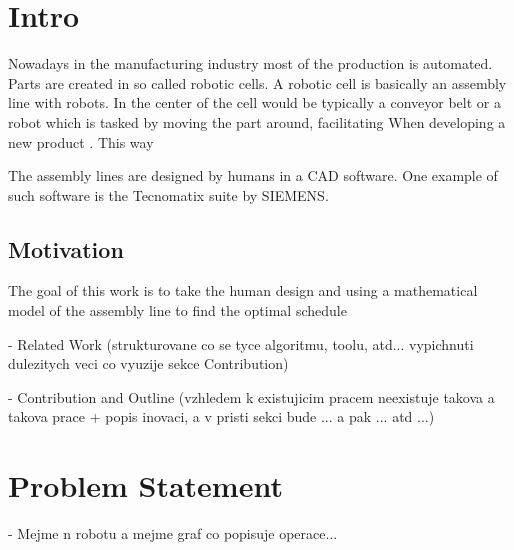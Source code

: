 \section{Intro}
Nowadays in the manufacturing industry most of the production is automated. Parts are created in so called robotic cells. A robotic cell is basically an assembly line with robots. In the center of the cell would be typically a conveyor belt or a robot which is tasked by moving the part around, facilitating   When developing a new product . This way 

The assembly lines are designed by humans in a CAD software. One example of such software is the Tecnomatix suite by SIEMENS.

\subsection{Motivation}
The goal of this work is to take the human design and using a mathematical model of the assembly line to find the optimal schedule


- Related Work (strukturovane co se tyce algoritmu, toolu, atd... vypichnuti dulezitych veci co vyuzije sekce Contribution)

- Contribution and Outline (vzhledem k existujicim pracem neexistuje takova a takova prace + popis inovaci, a v pristi sekci bude ... a pak ... atd ...)

\section{Problem Statement}
- Mejme n robotu a mejme graf co popisuje operace... 